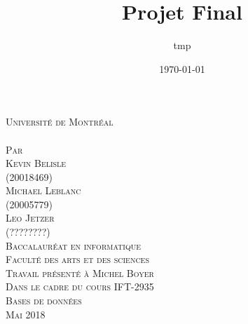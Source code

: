 \documentclass[a4paper,12pt]{article}
\date{\today}
\title{Projet Final}
\author{tmp}
\newcommand{\Author}{Kevin Belisle}
\newcommand{\Authorr}{Michael Leblanc}
\newcommand{\Authorrr}{Leo Jetzer}
\newcommand{\Teacher}{Michel Boyer}
\newcommand{\ClassNum}{IFT-2935}
\newcommand{\ClassName}{Bases de données}
\newcommand{\DateMMMMYYYY}{Mai 2018}
\begin{document}
	\begin{titlepage} 
		\begin{center}
			\textsc{\normalsize Université de Montréal}\\[2.25cm]
			 
			\textsc{\LARGE \@title}\\[2.25cm]
			
			\textsc{\small Par}\\[0.25cm]
			\textsc{\LARGE \Author}\\[0.25cm]
			\textsc{\normalsize (20018469)}\\[0.25cm]
			\textsc{\LARGE \Authorr}\\[0.25cm]
			\textsc{\normalsize (20005779)}\\[0.25cm]
			\textsc{\LARGE \Authorrr}\\[0.25cm]
			\textsc{\normalsize (????????)}\\[2cm]
			
			\textsc{\normalsize Baccalauréat en informatique}\\
			\textsc{\normalsize Faculté des arts et des sciences}\\[2.25cm]
			
			\textsc{\small Travail présenté à \Teacher}\\
			\textsc{\small Dans le cadre du cours \ClassNum}\\
			\textsc{\small \ClassName}\\[2.25cm]
			
			\textsc{\normalsize \DateMMMMYYYY}\\[1.5cm]
		\end{center}
	\end{titlepage}
\end{document}
